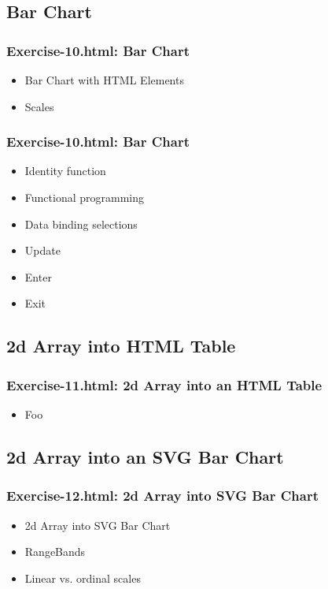 \documentclass{beamer}
\begin{document}
\subsection{Bar Chart}


\begin{frame}
    \frametitle{Exercise-10.html: Bar Chart}
    \begin{itemize}
    \item Bar Chart with HTML Elements
    \item Scales
    \end{itemize}
\end{frame}



\begin{frame}
    \frametitle{Exercise-10.html: Bar Chart}
    \begin{itemize}
    \item Identity function
    \item Functional programming
    \item Data binding selections
    \item Update
    \item Enter
    \item Exit
    \end{itemize}
\end{frame}



\begin{frame}

\end{frame}



\subsection{2d Array into HTML Table}

\begin{frame}
    \frametitle{Exercise-11.html: 2d Array into an HTML Table}
    \begin{itemize}
    \item Foo
    \end{itemize}
\end{frame}



\subsection{2d Array into an SVG Bar Chart}

\begin{frame}
    \frametitle{Exercise-12.html: 2d Array into SVG Bar Chart}
    \begin{itemize}
    \item 2d Array into SVG Bar Chart
    \item RangeBands
    \item Linear vs. ordinal scales
    \end{itemize}
\end{frame}
\end{document}
